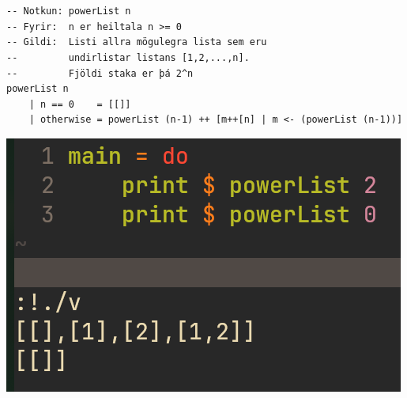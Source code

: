 \documentclass{article}
\begin{document}
	\section{}
	\begin{verbatim}
-- Notkun: powerList n
-- Fyrir:  n er heiltala n >= 0
-- Gildi:  Listi allra mögulegra lista sem eru
--         undirlistar listans [1,2,...,n]. 
--         Fjöldi staka er þá 2^n
powerList n
    | n == 0    = [[]]
    | otherwise = powerList (n-1) ++ [m++[n] | m <- (powerList (n-1))]
	\end{verbatim}
    \vspace{.5em}
	\begin{center}
		\includegraphics[scale=0.35]{pl.png}
	\end{center}
\end{document}
